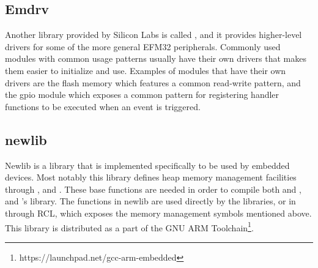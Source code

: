 \subsection{Emdrv}

Another library provided by Silicon Labs is called , and it provides higher-level drivers for some of the more general EFM32 peripherals.
Commonly used modules with common usage patterns usually have their own drivers that makes them easier to initialize and use.
Examples of modules that have their own drivers are the flash memory which features a common read-write pattern, and the \gls{gpio} module which exposes a common pattern for registering handler functions to be executed when an event is triggered.

\subsection{newlib}

Newlib is a {\C} library that is implemented specifically to be used by embedded devices.
Most notably this library defines heap memory management facilities through ,  and .
These base functions are needed in order to compile both {\emlib} and , and {\rust}'s  library.
The functions in newlib are used directly by the {\C} libraries, or in {\rust} through \gls{RCL}, which exposes the memory management symbols mentioned above.
This library is distributed as a part of the GNU ARM Toolchain\footnote{https://launchpad.net/gcc-arm-embedded}.
